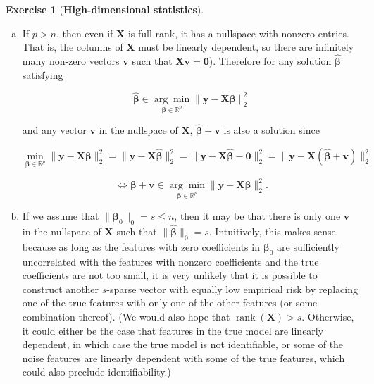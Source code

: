 \documentclass{article}
\theoremstyle{definition}
\newtheorem{exercise}{Exercise}
\theoremstyle{definition}
\theoremstyle{definition}
\theoremstyle{definition}
\begin{document}
\begin{exercise}[\textbf{High-dimensional statistics}]

\begin{enumerate}[(a)]

\item If \(p > n\), then even if \(\boldsymbol{X}\) is full rank, it has a nullspace with nonzero entries. That is, the columns of \(\boldsymbol{X}\) must be linearly dependent, so there are infinitely many non-zero vectors \(\boldsymbol{v}\) such that \(\boldsymbol{X}\boldsymbol{v} = \boldsymbol{0}\)). Therefore for any solution \(\hat{\boldsymbol{\beta}}\) satisfying 

\[
\hat{\boldsymbol{\beta}} \in \underset{\boldsymbol{\beta} \in \mathbb{R}^p}{\arg \min} \lVert \boldsymbol{y} - \boldsymbol{X} \boldsymbol{\beta} \rVert_2^2 
\]

and any vector \(\boldsymbol{v}\) in the nullspace of \(\boldsymbol{X}\), \(\hat{\boldsymbol{\beta}} + \boldsymbol{v}\) is also a solution since

\[
 \underset{\boldsymbol{\beta} \in \mathbb{R}^p}{\min} \lVert \boldsymbol{y} - \boldsymbol{X} \boldsymbol{\beta} \rVert_2^2 =  \lVert \boldsymbol{y} - \boldsymbol{X} \hat{\boldsymbol{\beta}} \rVert_2^2  =  \lVert \boldsymbol{y} - \boldsymbol{X} \hat{\boldsymbol{\beta}} - \boldsymbol{0} \rVert_2^2  =  \lVert \boldsymbol{y} - \boldsymbol{X} (\hat{\boldsymbol{\beta}} + \boldsymbol{v}) \rVert_2^2 
 \]
 
 \[
 \iff \boldsymbol{\beta} + \boldsymbol{v} \in \underset{\boldsymbol{\beta} \in \mathbb{R}^p}{\arg \min} \lVert \boldsymbol{y} - \boldsymbol{X} \boldsymbol{\beta} \rVert_2^2 .
\]

\item If we assume that \( \lVert \boldsymbol{\beta}_0 \rVert_0 = s \leq n\), then it may be that there is only one \(\boldsymbol{v}\) in the nullspace of \(\boldsymbol{X}\) such that \(\lVert \hat{\boldsymbol{\beta}}\rVert_0 = s\). Intuitively, this makes sense because as long as the features with zero coefficients in \(\boldsymbol{\beta}_0\) are sufficiently uncorrelated with the features with nonzero coefficients and the true coefficients are not too small, it is very unlikely that it is possible to construct another \(s\)-sparse vector with equally low empirical risk by replacing one of the true features with only one of the other features (or some combination thereof). (We would also hope that \(\operatorname{rank}(\boldsymbol{X}) > s\). Otherwise, it could either be the case that features in the true model are linearly dependent, in which case the true model is not identifiable, or some of the noise features are linearly dependent with some of the true features, which could also preclude identifiability.)


\end{enumerate}
\end{exercise}
\end{document}
